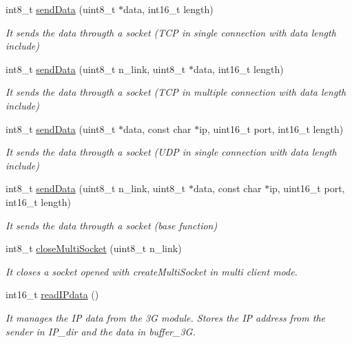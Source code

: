 \begin{DoxyCompactItemize}
\item 
int8\+\_\+t \hyperlink{class_wasp3_g_a09b887953339c44008252e9c613f87df}{send\+Data} (uint8\+\_\+t $\ast$data, int16\+\_\+t length)
\begin{DoxyCompactList}\small\item\em It sends the data througth a socket (T\+CP in single connection with data length include) \end{DoxyCompactList}\item 
int8\+\_\+t \hyperlink{class_wasp3_g_a4e569d738d061e48ebf61912a61252fc}{send\+Data} (uint8\+\_\+t n\+\_\+link, uint8\+\_\+t $\ast$data, int16\+\_\+t length)
\begin{DoxyCompactList}\small\item\em It sends the data througth a socket (T\+CP in multiple connection with data length include) \end{DoxyCompactList}\item 
int8\+\_\+t \hyperlink{class_wasp3_g_aba61491c611d8ba3c70d17e059c02624}{send\+Data} (uint8\+\_\+t $\ast$data, const char $\ast$ip, uint16\+\_\+t port, int16\+\_\+t length)
\begin{DoxyCompactList}\small\item\em It sends the data througth a socket (U\+DP in single connection with data length include) \end{DoxyCompactList}\item 
int8\+\_\+t \hyperlink{class_wasp3_g_a226c2901f1178d2e59f85c28ade1961a}{send\+Data} (uint8\+\_\+t n\+\_\+link, uint8\+\_\+t $\ast$data, const char $\ast$ip, uint16\+\_\+t port, int16\+\_\+t length)
\begin{DoxyCompactList}\small\item\em It sends the data througth a socket (base function) \end{DoxyCompactList}\item 
int8\+\_\+t \hyperlink{class_wasp3_g_a5d178930a6cec95191c05ccedf5e9bb9}{close\+Multi\+Socket} (uint8\+\_\+t n\+\_\+link)
\begin{DoxyCompactList}\small\item\em It closes a socket opened with create\+Multi\+Socket in multi client mode. \end{DoxyCompactList}\item 
int16\+\_\+t \hyperlink{class_wasp3_g_a328cf65f728c15657e9741d7764ab2eb}{read\+I\+Pdata} ()
\begin{DoxyCompactList}\small\item\em It manages the IP data from the 3G module. Stores the IP address from the sender in I\+P\+\_\+dir and the data in \textquotesingle{}buffer\+\_\+3G\textquotesingle{}. \end{DoxyCompactList}\item 

\end{DoxyCompactItemize}
